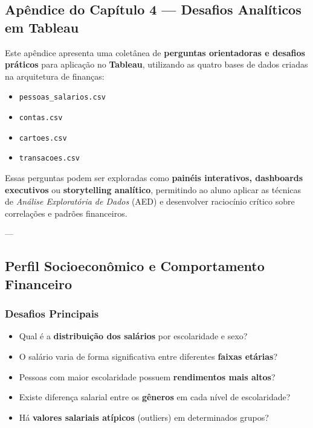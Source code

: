 \begin{appendices}

\chapter*{Apêndice do Capítulo 4 — Desafios Analíticos em Tableau}

Este apêndice apresenta uma coletânea de \textbf{perguntas orientadoras e desafios práticos} para aplicação no \textbf{Tableau}, utilizando as quatro bases de dados criadas na arquitetura de finanças:
\begin{itemize}
  \item \texttt{pessoas\_salarios.csv}
  \item \texttt{contas.csv}
  \item \texttt{cartoes.csv}
  \item \texttt{transacoes.csv}
\end{itemize}

Essas perguntas podem ser exploradas como \textbf{painéis interativos, dashboards executivos} ou \textbf{storytelling analítico}, permitindo ao aluno aplicar as técnicas de \textit{Análise Exploratória de Dados} (AED) e desenvolver raciocínio crítico sobre correlações e padrões financeiros.

---

\section{Perfil Socioeconômico e Comportamento Financeiro}

\subsection*{Desafios Principais}
\begin{itemize}
  \item Qual é a \textbf{distribuição dos salários} por escolaridade e sexo?
  \item O salário varia de forma significativa entre diferentes \textbf{faixas etárias}?
  \item Pessoas com maior escolaridade possuem \textbf{rendimentos mais altos}?
  \item Existe diferença salarial entre os \textbf{gêneros} em cada nível de escolaridade?
  \item Há \textbf{valores salariais atípicos} (outliers) em determinados grupos?
\end{itemize}


\end{appendices}
